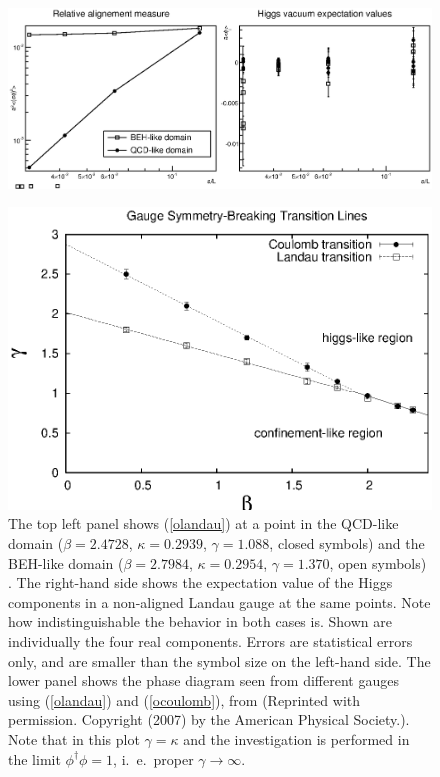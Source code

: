 \documentclass[final,twoside,12pt]{article}
\newcommand*{\pref}[1]{(\ref{#1})}
\newcommand*{\1}{1\!\!\!\bot}
\begin{document}
\begin{figure}[!htbp]
\includegraphics[width=\linewidth]{global}\\
\begin{minipage}{0.6\linewidth}
\includegraphics[width=\linewidth]{gc-pd}
\end{minipage}
\begin{minipage}{0.4\linewidth}
\caption{\label{fig:cg}The top left panel shows \pref{olandau} at a point in the QCD-like domain ($\beta=2.4728$, $\kappa=0.2939$, $\gamma=1.088$, closed symbols) and the BEH-like domain ($\beta=2.7984$, $\kappa=0.2954$, $\gamma=1.370$, open symbols) \cite{Maas:unpublished}. The right-hand side shows the expectation value of the Higgs components in a non-aligned Landau gauge \cite{Maas:2012ct,Maas:unpublished} at the same points. Note how indistinguishable the behavior in both cases is. Shown are individually the four real components. Errors are statistical errors only, and are smaller than the symbol size on the left-hand side. The lower panel shows the phase diagram seen from different gauges using \pref{olandau} and \pref{ocoulomb}, from \cite{Caudy:2007sf} (Reprinted with permission. Copyright (2007) by the American Physical Society.). Note that in this plot $\gamma=\kappa$ and the investigation is performed in the limit $\phi^\dagger\phi=1$, i.\ e.\ proper $\gamma\to\infty$.}
\end{minipage}
\end{figure}
\end{document}
